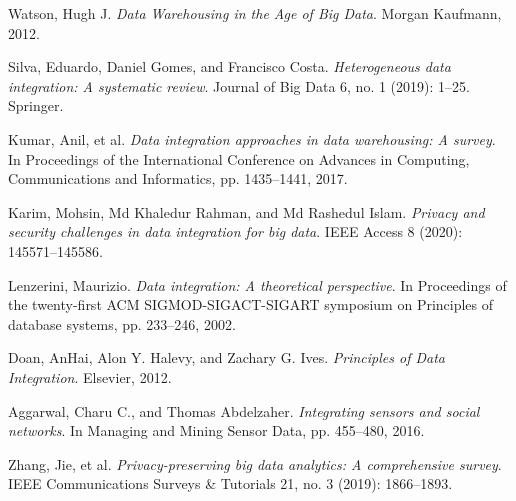 \documentclass[12pt]{article}
\begin{document}
\newpage
\begin{thebibliography}{10}

Watson, Hugh J. 
\textit{Data Warehousing in the Age of Big Data}. 
Morgan Kaufmann, 2012.

Silva, Eduardo, Daniel Gomes, and Francisco Costa. 
\textit{Heterogeneous data integration: A systematic review}. 
Journal of Big Data 6, no. 1 (2019): 1--25. Springer.

Kumar, Anil, et al. 
\textit{Data integration approaches in data warehousing: A survey}. 
In Proceedings of the International Conference on Advances in Computing, Communications and Informatics, pp. 1435--1441, 2017.

Karim, Mohsin, Md Khaledur Rahman, and Md Rashedul Islam. 
\textit{Privacy and security challenges in data integration for big data}. 
IEEE Access 8 (2020): 145571--145586.

Lenzerini, Maurizio. 
\textit{Data integration: A theoretical perspective}. 
In Proceedings of the twenty-first ACM SIGMOD-SIGACT-SIGART symposium on Principles of database systems, pp. 233--246, 2002.

Doan, AnHai, Alon Y. Halevy, and Zachary G. Ives. 
\textit{Principles of Data Integration}. 
Elsevier, 2012.

Aggarwal, Charu C., and Thomas Abdelzaher.
\textit{Integrating sensors and social networks}.
In Managing and Mining Sensor Data, pp. 455--480, 2016.

Zhang, Jie, et al. 
\textit{Privacy-preserving big data analytics: A comprehensive survey}. 
IEEE Communications Surveys & Tutorials 21, no. 3 (2019): 1866--1893.

\end{thebibliography}
\end{document}
